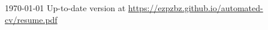 \documentclass[11pt, a4paper]{awesome-cv}
\begin{document}
\makecvheader[C]

\makecvfooter
{\today}
{Up-to-date version at \upshape\color{text}\url{https://ezpzbz.github.io/automated-cv/resume.pdf}}
{\thepage}



\medskip
\vspace{1em}

\vspace{-1em}


\medskip

\end{document}
